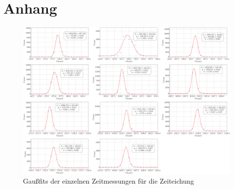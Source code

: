 \documentclass[12pt,a4paper,ngerman]{report}
\begin{document}
\chapter*{Anhang} \label{ch:Anhang}
\FloatBarrier
	\begin{figure}[ht]
	\centering
	\includegraphics[width=\textwidth]{Bilder/timeGaussFits.pdf}		
	\caption[Übersicht der Gaußfits]{Gaußfits der einzelnen Zeitmessungen für die Zeiteichung}
	\label{img:TimeGauss}
\end{figure}
\end{document}
